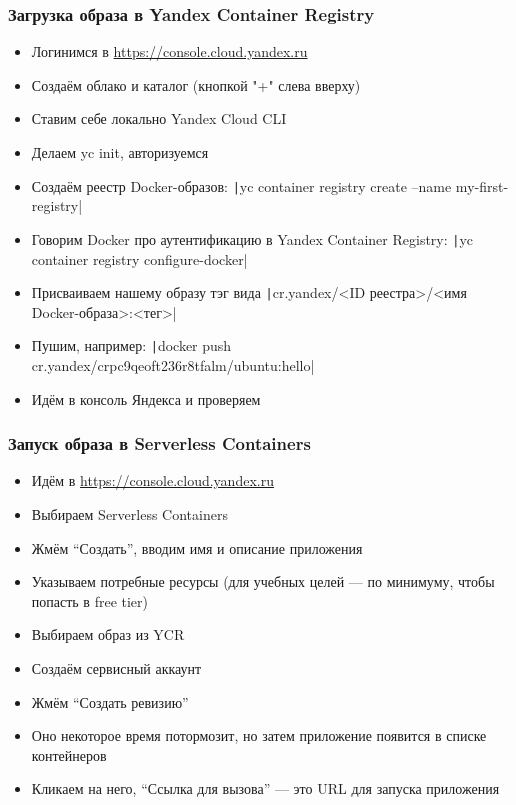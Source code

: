 \documentclass{../../slides-style}
\begin{document}
    \begin{frame}
        \frametitle{Загрузка образа в Yandex Container Registry}
        \begin{itemize}
            \item Логинимся в \url{https://console.cloud.yandex.ru}
            \item Создаём облако и каталог (кнопкой "+" слева  вверху)
            \item Ставим себе локально Yandex Cloud CLI
            \item Делаем yc init, авторизуемся
            \item Создаём реестр Docker-образов: \texttt|yc container registry create --name my-first-registry|
            \item Говорим Docker про аутентификацию в Yandex Container Registry: \texttt|yc container registry configure-docker|
            \item Присваиваем нашему образу тэг вида \texttt|cr.yandex/<ID реестра>/<имя Docker-образа>:<тег>|
            \item Пушим, например: \texttt|docker push cr.yandex/crpc9qeoft236r8tfalm/ubuntu:hello|
            \item Идём в консоль Яндекса и проверяем
        \end{itemize}
    \end{frame}

    \begin{frame}
        \frametitle{Запуск образа в Serverless Containers}
        \begin{itemize}
            \item Идём в \url{https://console.cloud.yandex.ru}
            \item Выбираем Serverless Containers
            \item Жмём ``Создать'', вводим имя и описание приложения
            \item Указываем потребные ресурсы (для учебных целей --- по минимуму, чтобы попасть в free tier)
            \item Выбираем образ из YCR
            \item Создаём сервисный аккаунт
            \item Жмём ``Создать ревизию''
            \item Оно некоторое время потормозит, но затем приложение появится в списке контейнеров
            \item Кликаем на него, ``Ссылка для вызова'' --- это URL для запуска приложения
        \end{itemize}
    \end{frame}
\end{document}
